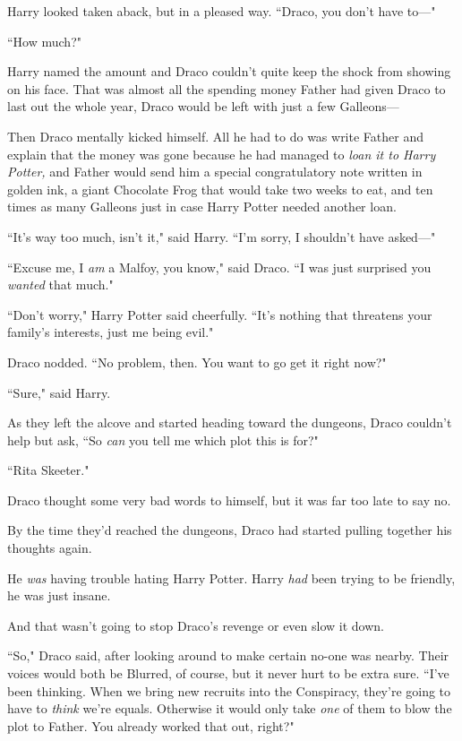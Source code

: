 Harry looked taken aback, but in a pleased way. ``Draco, you don't have to—"

``How much?"

Harry named the amount and Draco couldn't quite keep the shock from showing on his face. That was almost all the spending money Father had given Draco to last out the whole year, Draco would be left with just a few Galleons—

Then Draco mentally kicked himself. All he had to do was write Father and explain that the money was gone because he had managed to \emph{loan it to Harry Potter,} and Father would send him a special congratulatory note written in golden ink, a giant Chocolate Frog that would take two weeks to eat, and ten times as many Galleons just in case Harry Potter needed another loan.

``It's way too much, isn't it," said Harry. ``I'm sorry, I shouldn't have asked—"

``Excuse me, I \emph{am} a Malfoy, you know," said Draco. ``I was just surprised you \emph{wanted} that much."

``Don't worry," Harry Potter said cheerfully. ``It's nothing that threatens your family's interests, just me being evil."

Draco nodded. ``No problem, then. You want to go get it right now?"

``Sure," said Harry.

As they left the alcove and started heading toward the dungeons, Draco couldn't help but ask, ``So \emph{can} you tell me which plot this is for?"

``Rita Skeeter."

Draco thought some very bad words to himself, but it was far too late to say no.

\later

By the time they'd reached the dungeons, Draco had started pulling together his thoughts again.

He \emph{was} having trouble hating Harry Potter. Harry \emph{had} been trying to be friendly, he was just insane.

And that wasn't going to stop Draco's revenge or even slow it down.

``So," Draco said, after looking around to make certain no-one was nearby. Their voices would both be Blurred, of course, but it never hurt to be extra sure. ``I've been thinking. When we bring new recruits into the Conspiracy, they're going to have to \emph{think} we're equals. Otherwise it would only take \emph{one} of them to blow the plot to Father. You already worked that out, right?"

